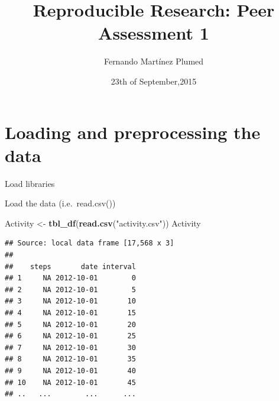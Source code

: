 \documentclass[]{article}
\title{Reproducible Research: Peer Assessment 1}
\author{Fernando Martínez Plumed}
\date{23th of September,2015}
\newenvironment{Shaded}{\begin{snugshade}}{\end{snugshade}}
\newcommand{\KeywordTok}[1]{\textcolor[rgb]{0.13,0.29,0.53}{\textbf{{#1}}}}
\newcommand{\DataTypeTok}[1]{\textcolor[rgb]{0.13,0.29,0.53}{{#1}}}
\newcommand{\DecValTok}[1]{\textcolor[rgb]{0.00,0.00,0.81}{{#1}}}
\newcommand{\StringTok}[1]{\textcolor[rgb]{0.31,0.60,0.02}{{#1}}}
\newcommand{\CommentTok}[1]{\textcolor[rgb]{0.56,0.35,0.01}{\textit{{#1}}}}
\newcommand{\OtherTok}[1]{\textcolor[rgb]{0.56,0.35,0.01}{{#1}}}
\newcommand{\NormalTok}[1]{{#1}}
\begin{document}
\maketitle


\section{Loading and preprocessing the
data}\label{loading-and-preprocessing-the-data}

Load libraries

\begin{Shaded}
\end{Shaded}

Load the data (i.e.~read.csv())

\begin{Shaded}
\begin{Highlighting}[]
\NormalTok{Activity <-}\StringTok{ }\KeywordTok{tbl_df}\NormalTok{(}\KeywordTok{read.csv}\NormalTok{(}\StringTok{"activity.csv"}\NormalTok{))}
\NormalTok{Activity}
\end{Highlighting}
\end{Shaded}

\begin{verbatim}
## Source: local data frame [17,568 x 3]
## 
##    steps       date interval
## 1     NA 2012-10-01        0
## 2     NA 2012-10-01        5
## 3     NA 2012-10-01       10
## 4     NA 2012-10-01       15
## 5     NA 2012-10-01       20
## 6     NA 2012-10-01       25
## 7     NA 2012-10-01       30
## 8     NA 2012-10-01       35
## 9     NA 2012-10-01       40
## 10    NA 2012-10-01       45
## ..   ...        ...      ...
\end{verbatim}
\end{document}
